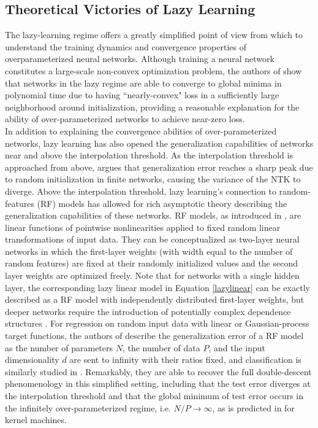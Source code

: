 \documentclass[11pt]{article}
\begin{document}
\subsection{Theoretical Victories of Lazy Learning}

The lazy-learning regime offers a greatly simplified point of view from which to understand the training dynamics and convergence properties of overparameterized neural networks. Although training a neural network constitutes a large-scale non-convex optimization problem, the authors of \cite{allen-zhuConvergenceTheoryDeep2019} show that networks in the lazy regime are able to converge to global minima in polynomial time due to having ``nearly-convex" loss in a sufficiently large neighborhood around initialization, providing a reasonable explanation for the ability of over-parameterized networks to achieve near-zero loss.\\

In addition to explaining the convergence abilities of over-parameterized networks, lazy learning has also opened the generalization capabilities of networks near and above the interpolation threshold. As the interpolation threshold is approached from above, \cite{geigerScalingDescriptionGeneralization2019} argues that generalization error reaches a sharp peak due to random initialization in finite networks, causing the variance of the NTK to diverge. Above the interpolation threshold, lazy learning's connection to random-features (RF) models has allowed for rich asymptotic theory describing the generalization capabilities of these networks. RF models, as introduced in \cite{rahimiRandomFeaturesLargeScale2008}, are linear functions of pointwise nonlinearities applied to fixed random linear transformations of input data. They can be conceptualized as two-layer neural networks in which the first-layer weights (with width equal to the number of random features) are fixed at their randomly initialized values and the second layer weights are optimized freely. Note that for networks with a single hidden layer, the corresponding lazy linear model in Equation \eqref{lazylinear} can be exactly described as a RF model with independently distributed first-layer weights, but deeper networks require the introduction of potentially complex dependence structures \cite{chizatLazyTrainingDifferentiable2020}. For regression on random input data with linear or Gaussian-process target functions, the authors of \cite{meiGeneralizationErrorRandom2019} describe the generalization error of a RF model as the number of parameters $N$, the number of data $P$, and the input dimensionality $d$ are sent to infinity with their ratios fixed, and classification is similarly studied in \cite{dengModelDoubleDescent2020}. Remarkably, they are able to recover the full double-descent phenomenology in this simplified setting, including that the test error diverges at the interpolation threshold and that the global minimum of test error occurs in the infinitely over-parameterized regime, i.e. $N/P\rightarrow\infty$, as is predicted in \cite{belkinReconcilingModernMachine2019,belkinUnderstandDeepLearning2018} for kernel machines.\\
\end{document}
